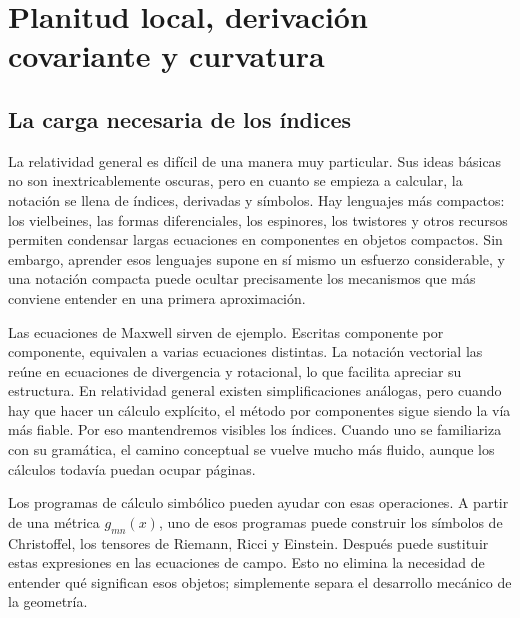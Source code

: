 \chapter{Planitud local, derivación covariante y curvatura}


\section{La carga necesaria de los índices}

La relatividad general es difícil de una manera muy particular. Sus ideas básicas no son inextricablemente oscuras, pero en cuanto se empieza a calcular, la notación se llena de índices, derivadas y símbolos. Hay lenguajes más compactos: los vielbeines, las formas diferenciales, los espinores, los twistores y otros recursos permiten condensar largas ecuaciones en componentes en objetos compactos. Sin embargo, aprender esos lenguajes supone en sí mismo un esfuerzo considerable, y una notación compacta puede ocultar precisamente los mecanismos que más conviene entender en una primera aproximación.

Las ecuaciones de Maxwell sirven de ejemplo. Escritas componente por componente, equivalen a varias ecuaciones distintas. La notación vectorial las reúne en ecuaciones de divergencia y rotacional, lo que facilita apreciar su estructura. En relatividad general existen simplificaciones análogas, pero cuando hay que hacer un cálculo explícito, el método por componentes sigue siendo la vía más fiable. Por eso mantendremos visibles los índices. Cuando uno se familiariza con su gramática, el camino conceptual se vuelve mucho más fluido, aunque los cálculos todavía puedan ocupar páginas.

Los programas de cálculo simbólico pueden ayudar con esas operaciones. A partir de una métrica \(g_{mn}(x)\), uno de esos programas puede construir los símbolos de Christoffel, los tensores de Riemann, Ricci y Einstein. Después puede sustituir estas expresiones en las ecuaciones de campo. Esto no elimina la necesidad de entender qué significan esos objetos; simplemente separa el desarrollo mecánico de la geometría.

